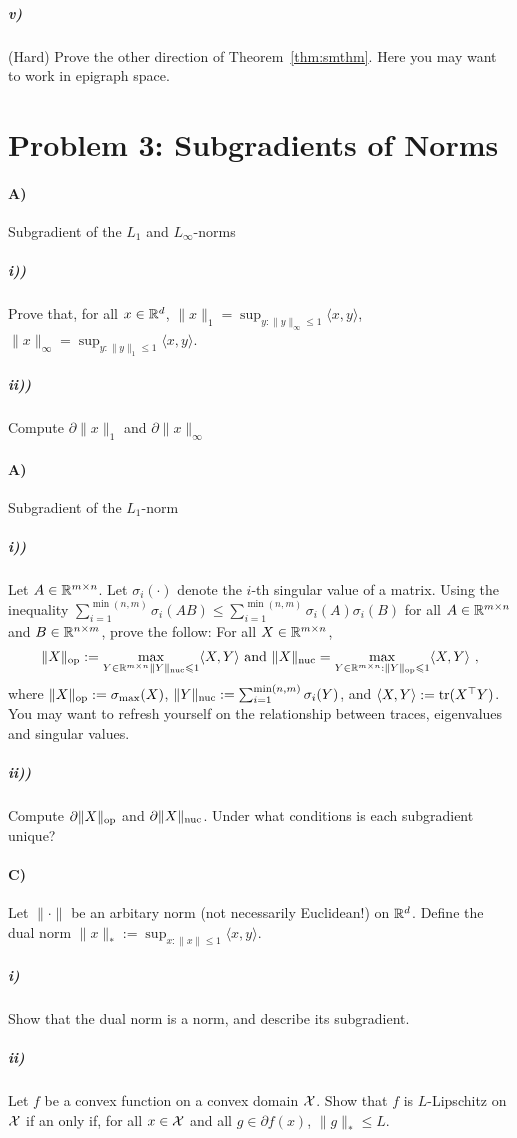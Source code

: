 \documentclass[12pt]{article}
\begin{document}
\subparagraph{v)} (Hard) Prove the other direction of Theorem~\ref{thm:smthm}. Here you may want to work in epigraph space. 


\section*{Problem 3: Subgradients of Norms}
\paragraph{A)} Subgradient of the $L_1$ and $L_{\infty}$-norms
\subparagraph{i))} Prove that, for all $x \in \mathbb{R}^d$, $\|x\|_1 = \sup_{y: \|y\|_{\infty} \le 1}\langle x, y \rangle$, $\|x\|_{\infty} = \sup_{y:\|y\|_1 \le 1}\langle x, y \rangle$. 
\subparagraph{ii))} Compute $\partial \|x\|_1$ and $\partial \|x\|_{\infty}$
\paragraph{A)} Subgradient of the $L_1$-norm
\subparagraph{i))} Let $A \in \mathbb{R}^{m \times n}$. Let $\sigma_i(\cdot)$ denote the $i$-th singular value of a matrix. Using the inequality $\sum_{i=1}^{\min(n,m)}\sigma_i(AB) \le \sum_{i=1}^{\min(n,m)} \sigma_i(A)\sigma_i(B)$ for all $A \in \mathbb{R}^{m \times n}$ and $B \in \mathbb{R}^{n \times m}$, prove the follow: For all $X \in \mathbb{R}^{m \times n}$, 
\begin{eqnarray}
\|X\|_{\mathrm{op}} :=  \max_{Y \in \mathbb{R}^{m \times n}  \|Y\|_{\mathrm{nuc}} \leqslant 1} \langle X, Y \rangle  \text{ and } \|X\|_{\mathrm{nuc}} =  \max_{Y \in \mathbb{R}^{m \times n} :\|Y\|_{\mathrm{op}} \leqslant 1} \langle X, Y \rangle ~,
\end{eqnarray}
where $\|X\|_{\mathrm{op}} := \sigma_{\max}(X)$, $ \|Y\|_{\mathrm{nuc}} := \sum_{i=1}^{\min(n,m)} \sigma_i(Y)$, and $\langle X, Y \rangle := \mathrm{tr}(X^\top Y)$. You may want to refresh yourself on the relationship between traces, eigenvalues and singular values. 
\subparagraph{ii))} Compute $\partial \|X\|_{\mathrm{op}}$ and $\partial \|X\|_{\mathrm{nuc}}$. Under what conditions is each subgradient unique?
\paragraph{C)} Let  $\|\cdot\|$ be an arbitary norm (not necessarily Euclidean!) on $\mathbb{R}^d$. Define the dual norm $\|x\|_* := \sup_{x: \|x\| \le 1}\langle x,y \rangle$. 
\subparagraph{i)} Show that the dual norm is a norm, and describe its subgradient.
\subparagraph{ii)} Let $f$ be a convex function on a convex domain ${\cal X}$. Show that $f$ is $L$-Lipschitz on ${\cal X}$ if an only if, for all $x \in {\cal X}$ and all $g \in \partial f(x)$, $\|g\|_{*} \le L$. 
\end{document}
